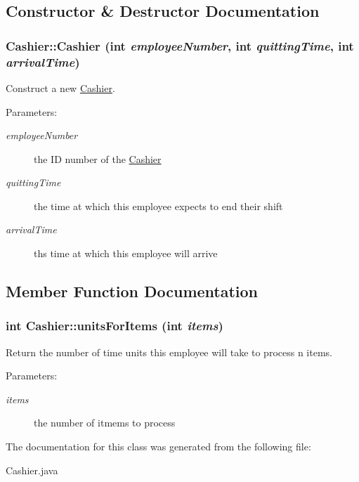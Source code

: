 \subsection{Constructor \& Destructor Documentation}
\hypertarget{class_cashier_f2d5ea95917be1e7ae459b14299b6341}{
\subsubsection[{Cashier}]{\setlength{\rightskip}{0pt plus 5cm}Cashier::Cashier (int {\em employeeNumber}, \/  int {\em quittingTime}, \/  int {\em arrivalTime})}}
\label{class_cashier_f2d5ea95917be1e7ae459b14299b6341}


Construct a new \hyperlink{class_cashier}{Cashier}. 

\begin{Desc}
\item[Parameters:]
\begin{description}
\item[{\em employeeNumber}]the ID number of the \hyperlink{class_cashier}{Cashier} \item[{\em quittingTime}]the time at which this employee expects to end their shift \item[{\em arrivalTime}]ths time at which this employee will arrive \end{description}
\end{Desc}


\subsection{Member Function Documentation}
\hypertarget{class_cashier_d5c921d4dfccb88928f8cd501397249e}{
\subsubsection[{unitsForItems}]{\setlength{\rightskip}{0pt plus 5cm}int Cashier::unitsForItems (int {\em items})}}
\label{class_cashier_d5c921d4dfccb88928f8cd501397249e}


Return the number of time units this employee will take to process n items. 

\begin{Desc}
\item[Parameters:]
\begin{description}
\item[{\em items}]the number of itmems to process \end{description}
\end{Desc}


The documentation for this class was generated from the following file:\begin{CompactItemize}
\item 
Cashier.java\end{CompactItemize}
